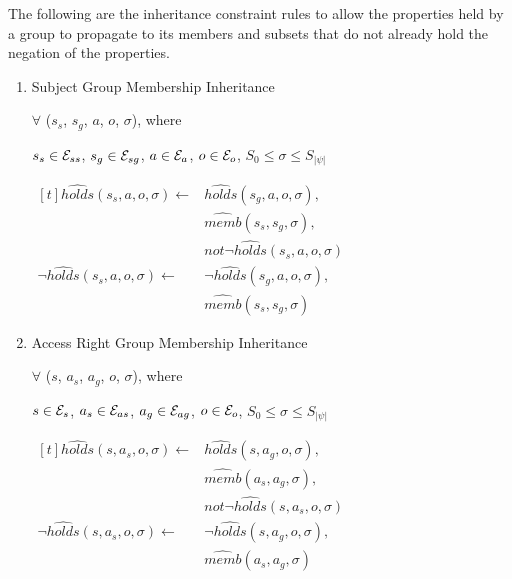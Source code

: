 \documentclass[11pt, twocolumn]{article}
\begin{document}
            The following are the inheritance constraint rules to allow the
            properties held by a group to propagate to its members and
            subsets that do not already hold the negation of the properties.

            \begin{enumerate}
              \item
                Subject Group Membership Inheritance

                $\forall$ ($s_{s}$, $s_{g}$, $a$, $o$, $\sigma$), where

                $s_{s} \in {\cal E}_{ss}$,
                $s_{g} \in {\cal E}_{sg}$,
                $a \in {\cal E}_{a}$,
                $o \in {\cal E}_{o}$,
                $S_{0} \leq \sigma \leq S_{|\psi|}$

                \begin{math}
                  \begin{aligned}[t]
                    \hat{holds}(s_{s}, a, o, \sigma) \leftarrow &
                    \hat{holds}(s_{g}, a, o, \sigma), \\
                    & \hat{memb}(s_{s}, s_{g}, \sigma), \\
                    & not \lnot \hat{holds}(s_{s}, a, o, \sigma) \\
                    \lnot \hat{holds}(s_{s}, a, o, \sigma) \leftarrow &
                    \lnot \hat{holds}(s_{g}, a, o, \sigma), \\
                    & \hat{memb}(s_{s}, s_{g}, \sigma)
                  \end{aligned}
                \end{math}

              \item
                Access Right Group Membership Inheritance

                $\forall$ ($s$, $a_{s}$, $a_{g}$, $o$, $\sigma$), where

                $s \in {\cal E}_{s}$,
                $a_{s} \in {\cal E}_{as}$,
                $a_{g} \in {\cal E}_{ag}$,
                $o \in {\cal E}_{o}$,
                $S_{0} \leq \sigma \leq S_{|\psi|}$

                \begin{math}
                  \begin{aligned}[t]
                    \hat{holds}(s, a_{s}, o, \sigma) \leftarrow &
                    \hat{holds}(s, a_{g}, o, \sigma), \\
                    & \hat{memb}(a_{s}, a_{g}, \sigma), \\
                    & not \lnot \hat{holds}(s, a_{s}, o, \sigma) \\
                    \lnot \hat{holds}(s, a_{s}, o, \sigma) \leftarrow &
                    \lnot \hat{holds}(s, a_{g}, o, \sigma), \\
                    & \hat{memb}(a_{s}, a_{g}, \sigma)
                  \end{aligned}
                \end{math}


\end{enumerate}
\end{document}
